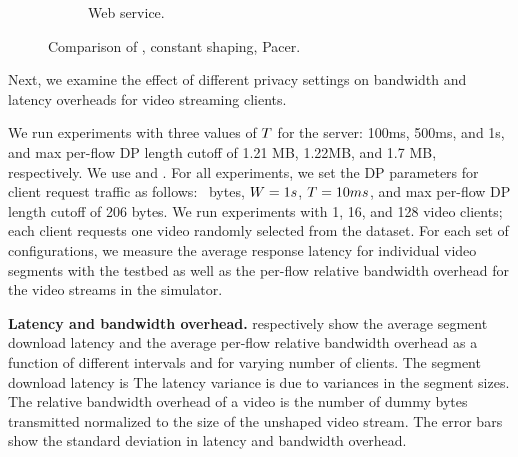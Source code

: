 \begin{figure}[t]
\begin{subfigure}[b]{0.485\columnwidth}
      \caption{Web service.}
      \label{fig:web-overheads-compare}
  \end{subfigure}
  \caption{Comparison of {\sys}, constant shaping, Pacer.}
  \vspace{-0.4cm}
\end{figure}
Next, we examine the effect of different privacy settings on bandwidth and
latency overheads for video streaming clients.

We run experiments with three values of $T$
for the server: 100ms, 500ms, and 1s, and max per-flow DP length cutoff of
1.21 MB, 1.22MB, and 1.7 MB, respectively. We use
 and
.
For all experiments, we set the DP parameters for client request traffic as
follows: ~bytes, $W = 1s$, $T = 10ms$,
 and max per-flow DP length cutoff of 206 bytes.
We run experiments with 1, 16, and 128 video
clients; each client requests one video randomly selected from the dataset.
For each set of configurations, we measure the average response latency for
individual video segments with the testbed as well as the per-flow relative
bandwidth overhead for the video streams in the simulator.

\textbf{Latency and bandwidth overhead.}
 respectively show the
average segment download latency and the average per-flow relative bandwidth
overhead as a function of different intervals and for varying number of clients.
The {\base} segment download latency is  The latency
variance is due to variances in the segment sizes.
The relative bandwidth overhead of a video is the
number of dummy bytes transmitted normalized to the size of the unshaped video
stream.
The error bars show the standard deviation in latency and bandwidth overhead.

